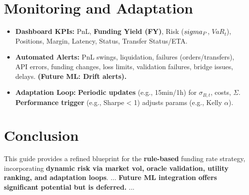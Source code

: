 \documentclass{article}
\begin{document}
\section{Monitoring and Adaptation}
\begin{itemize}
    \item \textbf{Dashboard KPIs:} PnL, \textbf{Funding Yield (FY)}, Risk ($\\sigma_P$, $VaR_t$), Positions, Margin, Latency, Status, Transfer Status/ETA.
    \item \textbf{Automated Alerts:} PnL swings, liquidation, failures (orders/transfers), API errors, funding changes, loss limits, validation failures, bridge issues, delays. \textbf{(Future ML: Drift alerts).}
    \item \textbf{Adaptation Loop:} \textbf{Periodic updates} (e.g., 15min/1h) for $\sigma_{B,t}$, costs, $\Sigma$. \textbf{Performance trigger} (e.g., Sharpe < 1) adjusts params (e.g., Kelly $\alpha$).
\end{itemize}

\section{Conclusion}
This guide provides a refined blueprint for the \textbf{rule-based} funding rate strategy, incorporating \textbf{dynamic risk via market vol, oracle validation, utility ranking, and adaptation loops}. ... \textbf{Future ML integration offers significant potential but is deferred.} ...
\end{document}
